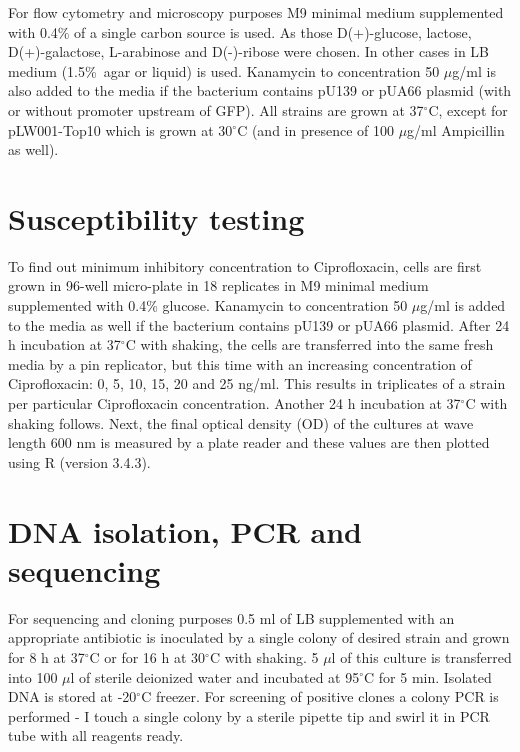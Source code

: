 For flow cytometry and microscopy purposes M9 minimal medium supplemented with 0.4\% of a single carbon source is used.
As those D(+)-glucose, lactose, D(+)-galactose, L-arabinose and D(-)-ribose were chosen.
In other cases in LB medium (1.5\%~agar or liquid) is used.
Kanamycin to concentration 50 $\mu$g/ml is also added to the media if the bacterium contains pU139 or pUA66 plasmid (with or without promoter upstream of GFP).
All strains are grown at 37$^{\circ}$C, except for pLW001-Top10 which is grown at 30$^{\circ}$C (and in presence of 100 $\mu$g/ml Ampicillin as well).


\hypertarget{MIC}{\section{Susceptibility testing}}
To find out minimum inhibitory concentration to Ciprofloxacin, cells are first grown in 96-well micro-plate in 18 replicates in M9 minimal medium supplemented with 0.4\% glucose.
Kanamycin to concentration 50 $\mu$g/ml is added to the media as well if the bacterium contains pU139 or pUA66 plasmid.
After 24 h incubation at 37$^{\circ}$C with shaking, the cells are transferred into the same fresh media by a pin replicator, but this time with an increasing concentration of Ciprofloxacin: 0, 5, 10, 15, 20 and 25 ng/ml.
This results in triplicates of a strain per particular Ciprofloxacin concentration.
Another 24 h incubation at 37$^{\circ}$C with shaking follows.
Next, the final optical density (OD) of the cultures at wave length 600 nm is measured by a plate reader and these values are then plotted using R (version 3.4.3).


\section{DNA isolation, PCR and sequencing}
For sequencing and cloning purposes 0.5 ml of LB supplemented with an appropriate antibiotic is inoculated by a single colony of desired strain and grown for 8 h at 37$^{\circ}$C or for 16 h at 30$^{\circ}$C with shaking.
5 $\mu$l of this culture is transferred into 100 $\mu$l of sterile deionized water and incubated at 95$^{\circ}$C for 5 min.
Isolated DNA is stored at -20$^{\circ}$C freezer.
For screening of positive clones a colony PCR is performed - I touch a single colony by a sterile pipette tip and swirl it in PCR tube with all reagents ready.

